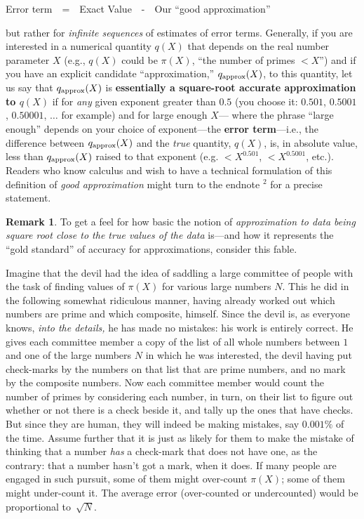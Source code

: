 \documentclass[11pt]{article}
\theoremstyle{plain}
\theoremstyle{definition}
\newtheorem{remark}[theorem]{Remark}
\numberwithin{equation}{section}
\numberwithin{figure}{section}
\numberwithin{table}{section}
\begin{document}
 \centerline{Error term\ \  =\ \    Exact Value\ \   -\ \   Our ``good  approximation''}
  
 \bigskip
 
 \noindent but rather for {\em infinite sequences} of estimates of
 error terms. Generally, if you are interested in a numerical quantity
 $q(X)$ that depends on the real number parameter $X$ (e.g., $q(X)$
 could be $\pi(X)$, ``the number of primes $< X$'') and if you have an
 explicit candidate ``approximation,'' $q_{\rm approx}(X)$, to this
 quantity, let us say that $q_{\rm approx}(X)$ is {\bf essentially a
   square-root accurate approximation to $q(X)$} if for {\em any}
 given exponent greater than $0.5$ (you choose it: $0.501$, $0.5001$,
 $0.50001$, $\dots$ for example) and for large enough $X$--- where the
 phrase ``large enough'' depends on your choice of exponent---the {\bf
   error term}---i.e., the difference between $q_{\rm approx}(X)$ and
 the {\em true} quantity, $q(X)$, is, in absolute value, less than
 $q_{\rm approx}(X)$ raised to that exponent (e.g. $< X^{0.501}$, $<
 X^{0.5001}$, etc.). Readers who know calculus and wish to have a
 technical formulation of this definition of {\em good approximation}
 might turn to the endnote $^2$ for a precise statement.

\begin{remark}
  To get a feel for how basic the notion of {\em approximation to data
    being square root close to the true values of the data} is---and
  how it represents the ``gold standard'' of accuracy for
  approximations, consider this fable.


  Imagine that the devil had the idea of saddling a large committee of
  people with the task of finding values of $\pi(X)$ for various large
  numbers $N$.  This he did in the following somewhat ridiculous
  manner, having already worked out which numbers are prime and which
  composite, himself. Since the devil is, as everyone knows, {\em into
    the details,} he has made no mistakes: his work is entirely
  correct.  He gives each committee member a copy of the list of all
  whole numbers between $1$ and one of the large numbers $N$ in which
  he was interested, the devil having put check-marks by the numbers
  on that list that are prime numbers, and no mark by the composite
  numbers. Now each committee member would count the number of primes
  by considering each number, in turn, on their list to figure out
  whether or not there is a check beside it, and tally up the ones
  that have checks. But since they are human, they will indeed be
  making mistakes, say $0.001\%$ of the time.  Assume further that it
  is just as likely for them to make the mistake of thinking that a
  number {\em has} a check-mark that does not have one, as the
  contrary: that a number hasn't got a mark, when it does.  If many
  people are engaged in such pursuit, some of them might over-count
  $\pi(X)$; some of them might under-count it. The average error
  (over-counted or undercounted) would be proportional to~${\sqrt N}$.

\end{remark}
\end{document}
